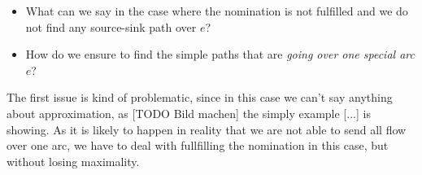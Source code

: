 % 
% 
% 
\begin{itemize}
 \item What can we say in the case where the nomination is not fulfilled and we do not find any source-sink path over 
$e$?
 \item How do we ensure to find the simple paths that are \textit{going over one special arc $e$}? 
\end{itemize}

The first issue is kind of problematic, since in this case we can't say anything about approximation, as [TODO Bild 
machen] the simply example [...] is showing. As it is likely to happen in reality that we are not able to send all flow 
over one arc, we have to deal with fullfilling the nomination in this case, but without losing maximality. 
